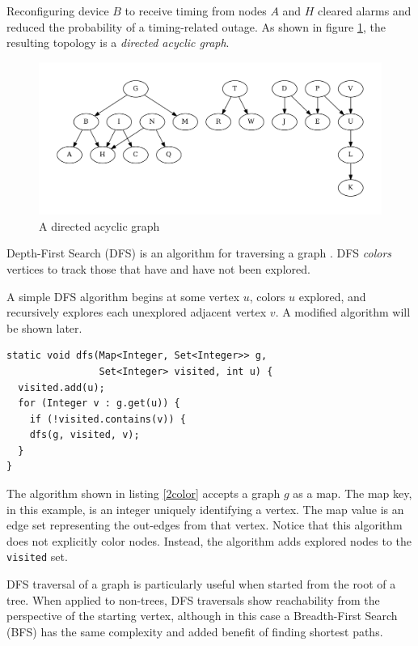 \documentclass{book}
\begin{document}
Reconfiguring device $B$ to receive timing from nodes $A$ and $H$ cleared alarms and reduced the probability of a timing-related outage. As shown in figure \ref{noloop}, the resulting topology is a \textit{directed acyclic graph}.

\begin{figure}
\centering
\includegraphics[width=\columnwidth]{ch-dag/noloop}
\caption{A directed acyclic graph}
\label{noloop}
\end{figure}

Depth-First Search (DFS) is an algorithm for traversing a graph \cite{Aho:1992:FCS:114768}. DFS \textit{colors} vertices to track those that have and have not been explored. 

A simple DFS algorithm begins at some vertex $u$, colors $u$ explored, and recursively explores each unexplored adjacent vertex $v$. A modified algorithm will be shown later.

\begin{lstlisting}[columns=fixed,caption={A simple DFS function of two colors},label={2color}]
static void dfs(Map<Integer, Set<Integer>> g,
                Set<Integer> visited, int u) {
  visited.add(u);
  for (Integer v : g.get(u)) {
    if (!visited.contains(v)) {
    dfs(g, visited, v);
  }
}
\end{lstlisting}

The algorithm shown in listing \ref{2color} accepts a graph $g$ as a map. The map key, in this example, is an integer uniquely identifying a vertex. The map value is an edge set representing the out-edges from that vertex. Notice that this algorithm does not explicitly color nodes. Instead, the algorithm adds explored nodes to the \texttt{visited} set.

DFS traversal of a graph is particularly useful when started from the root of a tree. When applied to non-trees, DFS traversals show reachability from the perspective of the starting vertex, although in this case a Breadth-First Search (BFS) has the same complexity and added benefit of finding shortest paths.
\end{document}
